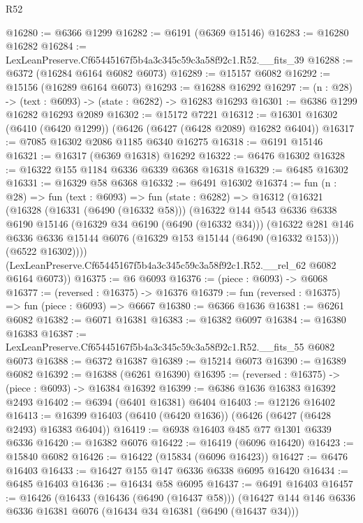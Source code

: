 \begin{lexlean}{R52}
\begin{coremodule}
@16280 := @6366 @1299
@16282 := @6191 (@6369 @15146)
@16283 := @16280 @16282
@16284 := LexLeanPreserve.Cf65445167f5b4a3c345c59c3a58f92c1.R52.__fits_39
@16288 := @6372 (@16284 @6164 @6082 @6073)
@16289 := @15157 @6082
@16292 := @15156 (@16289 @6164 @6073)
@16293 := @16288 @16292
@16297 := (n : @28) -> (text : @6093) -> (state : @6282) -> @16283 @16293
@16301 := @6386 @1299 @16282 @16293 @2089
@16302 := @15172 @7221
@16312 := @16301 @16302 (@6410 (@6420 @1299)) (@6426 (@6427 (@6428 @2089) @16282 @6404))
@16317 := @7085 @16302 @2086 @1185 @6340 @16275
@16318 := @6191 @15146
@16321 := @16317 (@6369 @16318) @16292
@16322 := @6476 @16302
@16328 := @16322 @155 @1184 @6336 @6339 @6368 @16318
@16329 := @6485 @16302
@16331 := @16329 @58 @6368
@16332 := @6491 @16302
@16374 := fun (n : @28) =>
  fun (text : @6093) =>
  fun (state : @6282) =>
  @16312
    (@16321
      (@16328
        (@16331 (@6490 (@16332 @58)))
        (@16322
          @144
          @543
          @6336
          @6338
          @6190
          @15146
          (@16329 @34 @6190 (@6490 (@16332 @34)))
          (@16322
            @281
            @146
            @6336
            @6336
            @15144
            @6076
            (@16329 @153 @15144 (@6490 (@16332 @153)))
            (@6522 @16302))))
      (LexLeanPreserve.Cf65445167f5b4a3c345c59c3a58f92c1.R52.__rel_62 @6082 @6164 @6073))
@16375 := @6 @6093
@16376 := (piece : @6093) -> @6068
@16377 := (reversed : @16375) -> @16376
@16379 := fun (reversed : @16375) => fun (piece : @6093) => @6667
@16380 := @6366 @1636
@16381 := @6261 @6082
@16382 := @6071 @16381
@16383 := @16382 @6097
@16384 := @16380 @16383
@16387 := LexLeanPreserve.Cf65445167f5b4a3c345c59c3a58f92c1.R52.__fits_55 @6082 @6073
@16388 := @6372 @16387
@16389 := @15214 @6073
@16390 := @16389 @6082
@16392 := @16388 (@6261 @16390)
@16395 := (reversed : @16375) -> (piece : @6093) -> @16384 @16392
@16399 := @6386 @1636 @16383 @16392 @2493
@16402 := @6394 (@6401 @16381) @6404
@16403 := @12126 @16402
@16413 := @16399 @16403 (@6410 (@6420 @1636)) (@6426 (@6427 (@6428 @2493) @16383 @6404))
@16419 := @6938 @16403 @485 @77 @1301 @6339 @6336
@16420 := @16382 @6076
@16422 := @16419 (@6096 @16420)
@16423 := @15840 @6082
@16426 := @16422 (@15834 (@6096 @16423))
@16427 := @6476 @16403
@16433 := @16427 @155 @147 @6336 @6338 @6095 @16420
@16434 := @6485 @16403
@16436 := @16434 @58 @6095
@16437 := @6491 @16403
@16457 := @16426
    (@16433
      (@16436 (@6490 (@16437 @58)))
      (@16427
        @144
        @146
        @6336
        @6336
        @16381
        @6076
        (@16434 @34 @16381 (@6490 (@16437 @34)))

\end{coremodule}
\end{lexlean}
